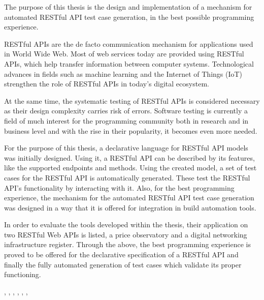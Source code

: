\begin{abstracteng}

The purpose of this thesis is the design and implementation of a mechanism for automated RESTful API test case generation,
in the best possible programming experience.

RESTful APIs are the de facto communication mechanism for applications used in World Wide Web.
Most of web services today are provided using RESTful APIs,
which help transfer information between computer systems.
Technological advances in fields such as machine learning and the Internet of Things (IoT)
strengthen the role of RESTful APIs in today's digital ecosystem.

At the same time, 
the systematic testing of RESTful APIs is considered necessary 
as their design complexity carries risk of errors.
Software testing is currently a field of much interest for the programming community
both in research and in business level
and with the rise in their popularity,
it becomes even more needed.

For the purpose of this thesis,
a declarative language for RESTful API models was initially designed.
Using it, a RESTful API can be described by its features,
like the supported endpoints and methods.
Using the created model, a set of test cases for the RESTful API is automatically generated.
These test the RESTful API's functionality by interacting with it.
Also, for the best programming experience,
the mechanism for the automated RESTful API test case generation was designed in a way 
that it is offered for integration in build automation tools.

In order to evaluate the tools developed within the thesis,
their application on two RESTful Web APIs is listed,
a price observatory and a digital networking infrastructure register.
Through the above,
the best programming experience is proved to be offered for the declarative specification of a RESTful API 
and finally the fully automated generation of test cases which validate its proper functioning.

\begin{keywordseng}
   , , , , , , 
\end{keywordseng}

\end{abstracteng}